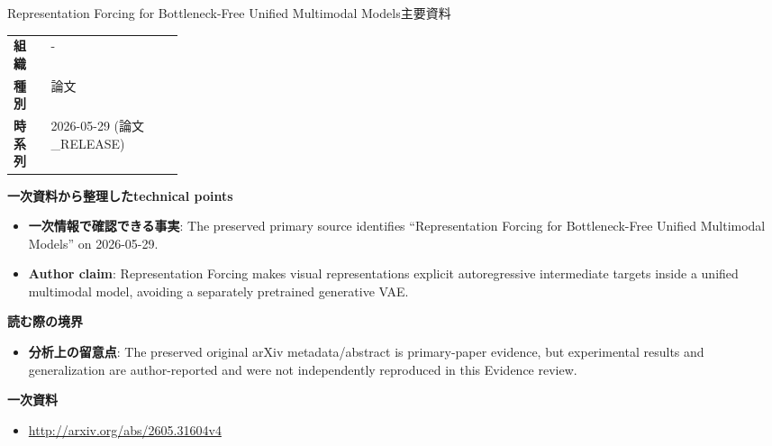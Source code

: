 \begin{technicalnote}{Representation Forcing for Bottleneck-Free Unified Multimodal Models}{主要資料}
\begin{tabularx}{\linewidth}{@{}>{\bfseries}p{0.22\linewidth}X@{}}
組織 & - \\
種別 & 論文 \\
時系列 & 2026-05-29 (論文\_RELEASE) \\
\end{tabularx}
\smallskip
{\bfseries 一次資料から整理したtechnical points}
\begin{itemize}[leftmargin=1.5em,itemsep=0.35em]
\item \textbf{一次情報で確認できる事実}: The preserved primary source identifies “Representation Forcing for Bottleneck-Free Unified Multimodal Models” on 2026-05-29.
\item \textbf{Author claim}: Representation Forcing makes visual representations explicit autoregressive intermediate targets inside a unified multimodal model, avoiding a separately pretrained generative VAE.
\end{itemize}
{\bfseries 読む際の境界}
\begin{itemize}[leftmargin=1.5em,itemsep=0.35em]
\item \textbf{分析上の留意点}: The preserved original arXiv metadata/abstract is primary-paper evidence, but experimental results and generalization are author-reported and were not independently reproduced in this Evidence review.
\end{itemize}
{\bfseries 一次資料}
\begingroup\sloppy
\begin{itemize}[leftmargin=1.5em,itemsep=0.25em]
\item {\scriptsize\url{http://arxiv.org/abs/2605.31604v4}}
\end{itemize}
\endgroup
\end{technicalnote}
\medskip
